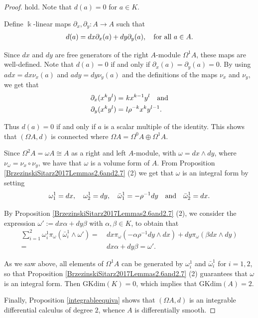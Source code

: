 \documentclass{amsart}
\theoremstyle{definition}
\theoremstyle{remark}
\numberwithin{equation}{section}
\begin{document}
\begin{proof}
hold. Note that $d(a)=0$ for $a \in K$.

Define $\Bbbk$-linear maps $\partial_{x}, \partial_{y}: A \rightarrow A$ such that
\begin{align*}
    d(a)=dx\partial_{x}(a)+dy\partial_{y}(a), \quad {\rm for\ all} \ a \in A.
\end{align*}

Since $dx$ and $dy$ are free generators of the right $A$-module $\Omega^1A$, these maps are well-defined. Note that $d(a)=0$ if and only if $\partial_{x}(a)=\partial_{y}(a)=0$. By using $adx=dx\nu_{x}(a)$ and $ady=dy\nu_{y}(a)$ and the definitions of the maps $\nu_{x}$ and $\nu_{y}$, we get that
\begin{align}
\partial_{x}(x^ky^l) = &\ kx^{k-1}y^l \quad {\rm and} \notag \\
\partial_{y}(x^ky^l) = &\ l\rho^{-k}x^ky^{l-1}.
\end{align}

Thus $d(a)=0$ if and only if $a$ is a scalar multiple of the identity. This shows that $(\Omega A,d)$ is connected where $\Omega A = \Omega^0 A \oplus \Omega^1 A$.

Since $\Omega^2A = \omega A\cong A$ as a right and left $A$-module, with $\omega=dx\wedge dy$, where $\nu_{\omega}=\nu_{x}\circ\nu_{y}$, we have that $\omega$ is a volume form of $A$. From Proposition \ref{BrzezinskiSitarz2017Lemmas2.6and2.7} (2) we get that $\omega$ is an integral form by setting
\[
\omega_1^1  = dx, \quad \omega_2^1 = dy, \quad \bar{\omega}_1^1 = -\rho^{-1}dy \quad {\rm and} \quad \bar{\omega}_2^1 = dx.
\]

By Proposition \ref{BrzezinskiSitarz2017Lemmas2.6and2.7} {\rm (2)}, we consider the expression $\omega' := dx\alpha + dy\beta$ with $\alpha, \beta  \in K$, to obtain that
\begin{align*}
\sum_{i=1}^{2}\omega_{i}^{1}\pi_{\omega}(\bar{\omega}_i^{1}\wedge \omega') = &\ dx\pi_{\omega}(-\alpha \rho^{-1} dy\wedge dx) + dy\pi_{\omega}(\beta dx\wedge dy) \\
     = &\ dx\alpha+ dy\beta = \omega'.
\end{align*}

As we saw above, all elements of $\Omega^1A$ can be generated by $\omega_i^1$ and $\bar{\omega}_i^{1}$ for $i=1,2$, so that Proposition \ref{BrzezinskiSitarz2017Lemmas2.6and2.7} {\rm (2)} guarantees that $\omega$ is an integral form. Then $\mathrm{GKdim}(K) = 0$, which implies that $\mathrm{GKdim}(A) = 2$.

Finally, Proposition \ref{integrableequiva} shows that $(\Omega A, d)$ is an integrable differential calculus of degree $2$, whence $A$ is differentially smooth.
\end{proof}
\end{document}
